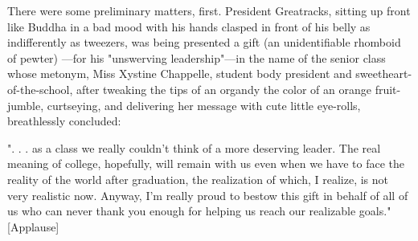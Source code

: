   There were some preliminary matters, first. President Greatracks, sitting up
front like Buddha in a bad mood with his hands clasped in front of his belly as
indifferently as tweezers, 
was being presented a gift (an unidentifiable rhomboid 
of pewter)
---for his "unswerving 
leadership"---in the name of the senior
class whose metonym, 
Miss Xystine Chappelle, student body president and
sweetheart-of-the-school, after tweaking the tips of an organdy 
the color of an orange fruit-jumble, 
curtseying, and delivering her message with cute little
eye-rolls, breathlessly concluded:
 
  ". . . as a class we really couldn't think of a more deserving leader. The
real meaning of college, hopefully, will remain with us even when we have to
face the reality of the world after graduation, the realization of which, I
realize, is not very realistic now. Anyway, I'm really proud to bestow this gift
in behalf of all of us who can never thank you enough for helping us reach our
realizable goals." [Applause]
 
